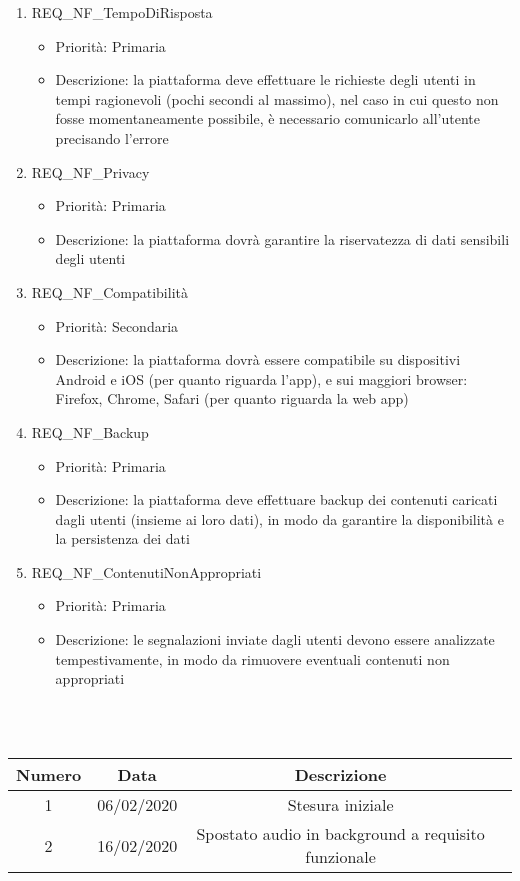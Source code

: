 \begin{enumerate}	
	\item REQ\_NF\_TempoDiRisposta
		\begin{itemize}
		\item Priorità: Primaria
		\item Descrizione: la piattaforma deve effettuare le richieste degli utenti in tempi ragionevoli (pochi secondi al massimo), nel caso in cui questo non fosse momentaneamente possibile, è necessario comunicarlo all'utente precisando l'errore
		\end{itemize}

	\item REQ\_NF\_Privacy
		\begin{itemize}
		\item Priorità: Primaria
		\item Descrizione: la piattaforma dovrà garantire la riservatezza di dati sensibili degli utenti
		\end{itemize}

	\item REQ\_NF\_Compatibilità
		\begin{itemize}
		\item Priorità: Secondaria
		\item Descrizione: la piattaforma dovrà essere compatibile su dispositivi Android e iOS (per quanto riguarda l'app), e sui maggiori browser: Firefox, Chrome, Safari (per quanto riguarda la web app)
		\end{itemize}
	
	\item REQ\_NF\_Backup
		\begin{itemize}
		\item Priorità: Primaria
		\item Descrizione: la piattaforma deve effettuare backup dei contenuti caricati dagli utenti (insieme ai loro dati), in modo da garantire la disponibilità e la persistenza dei dati
		\end{itemize}

	\item REQ\_NF\_ContenutiNonAppropriati
		\begin{itemize}
		\item Priorità: Primaria
		\item Descrizione: le segnalazioni inviate dagli utenti devono essere analizzate tempestivamente, in modo da rimuovere eventuali contenuti non appropriati
		\end{itemize}

\end{enumerate}

 \\ \\
\begin{tabular}{|c | c | c | c|} 
 	\hline
	 Numero & Data & Descrizione \\ [0.5ex] 
	\hline\hline
	1 & 06/02/2020 & Stesura iniziale \\ 
	\hline
	2 & 16/02/2020 & Spostato audio in background a requisito funzionale \\
	\hline
\end{tabular}
